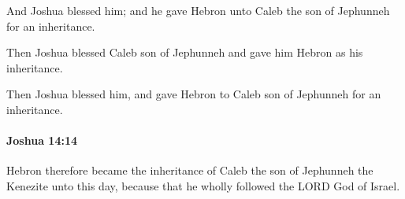 			\begin{versebox}
					\item[BHS] 
					\item[ASV] And Joshua blessed him; and he gave Hebron unto Caleb the son of Jephunneh for an inheritance.
					\item[NIV] Then Joshua blessed Caleb son of Jephunneh and gave him Hebron as his inheritance.
					\item[NRSV] Then Joshua blessed him, and gave Hebron to Caleb son of Jephunneh for an inheritance.
			\end{versebox}

		\paragraph{Joshua 14:14} %
			\label{JOSHUA-14-14}

			Hebron therefore became the inheritance of Caleb the son of Jephunneh the Kenezite unto this day, because that he wholly followed the LORD God of Israel.

